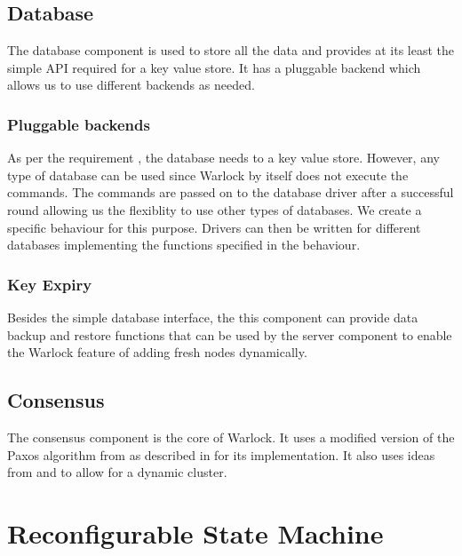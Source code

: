 \subsection{Database}

The database component is used to store all the data and provides at its
least the simple API required for a key value store. It has a pluggable backend 
which allows us to use different backends as needed.

\subsubsection{Pluggable backends}

As per the requirement , the database needs to a
key value store. However, any type of database can be used 
since Warlock by itself does not execute the commands. The commands are passed
on to the database driver after a successful round allowing us the flexiblity
to use other types of databases. We create a specific behaviour%
for this purpose. Drivers can then be written for different databases
implementing the functions specified in the behaviour.

\subsubsection{Key Expiry}


Besides the simple database interface, the this component can provide data
backup and restore functions that can be used by the server component to
enable the Warlock feature of adding fresh nodes dynamically.

\subsection{Consensus}

The consensus component is the core of Warlock. It uses a modified version of 
the Paxos algorithm from \citet{Robbert2011} as described in 
 for its implementation. It also
uses ideas from \citet{LamportSP08} and \citet{LamportMZ10} to allow for
a dynamic cluster.

\section{Reconfigurable State Machine}

